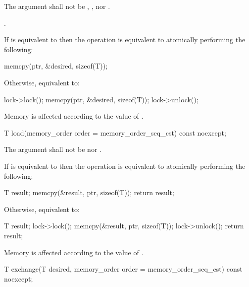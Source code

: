 \begin{itemdescr}
\pnum
\removed{\requires}\added{\expects} The  argument shall not be
,
, nor
.

\pnum
{}.
\begin{addedblock}
\effects If  is equivalent to 
then the operation is equivalent to atomically performing the following:
\begin{codeblock}
  memcpy(ptr, &desired, sizeof(T));
\end{codeblock}
Otherwise, equivalent to:
\begin{codeblock}
  lock->lock();
  memcpy(ptr, &desired, sizeof(T));
  lock->unlock();
\end{codeblock}
\end{addedblock}
Memory is affected according to the value of .
\end{itemdescr}

\begin{itemdecl}
T load(memory_order order = memory_order_seq_cst) const noexcept;
\end{itemdecl}

\begin{itemdescr}
\pnum
\removed{\requires}\added{\expects} The  argument shall not be
 nor .

\begin{addedblock}
\pnum
\effects If  is equivalent to  then the
operation is equivalent to atomically performing the following:
\begin{codeblock}
  T result;
  memcpy(&result, ptr, sizeof(T));
  return result;
\end{codeblock}
Otherwise, equivalent to:
\begin{codeblock}
  T result;
  lock->lock();
  memcpy(&result, ptr, sizeof(T));
  lock->unlock();
  return result;
\end{codeblock}
\end{addedblock}
Memory is affected according to the value of .

\end{itemdescr}

\begin{itemdecl}
T exchange(T desired, memory_order order = memory_order_seq_cst) const noexcept;
\end{itemdecl}

